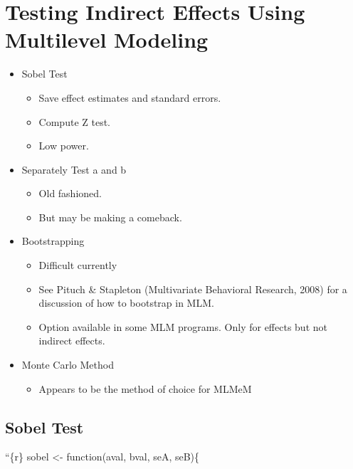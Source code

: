 \documentclass[
  man,floatsintext]{apa6}
\providecommand{\tightlist}{%
  \setlength{\itemsep}{0pt}\setlength{\parskip}{0pt}}
\begin{document}
\hypertarget{testing-indirect-effects-using-multilevel-modeling}{%
\section{Testing Indirect Effects Using Multilevel Modeling}\label{testing-indirect-effects-using-multilevel-modeling}}

\begin{itemize}
\tightlist
\item
  Sobel Test

  \begin{itemize}
  \tightlist
  \item
    Save effect estimates and standard errors.
  \item
    Compute Z test.
  \item
    Low power.
  \end{itemize}
\item
  Separately Test a and b

  \begin{itemize}
  \tightlist
  \item
    Old fashioned.
  \item
    But may be making a comeback.
  \end{itemize}
\item
  Bootstrapping

  \begin{itemize}
  \tightlist
  \item
    Difficult currently
  \item
    See Pituch \& Stapleton (Multivariate Behavioral Research, 2008) for a discussion of how to bootstrap in MLM.
  \item
    Option available in some MLM programs. Only for effects but not indirect effects.
  \end{itemize}
\item
  Monte Carlo Method

  \begin{itemize}
  \tightlist
  \item
    Appears to be the method of choice for MLMeM
  \end{itemize}
\end{itemize}

\hypertarget{sobel-test}{%
\subsection{Sobel Test}\label{sobel-test}}

``\{r\}
sobel \textless- function(aval, bval, seA, seB)\{
\end{document}
